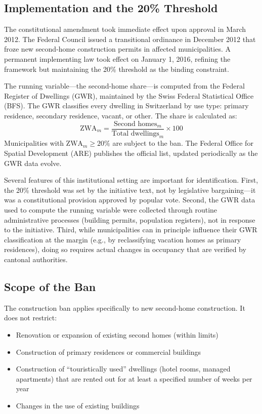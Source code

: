 \documentclass[12pt]{article}
\begin{document}
\subsection{Implementation and the 20\% Threshold}

The constitutional amendment took immediate effect upon approval in March 2012. The Federal Council issued a transitional ordinance in December 2012 that froze new second-home construction permits in affected municipalities. A permanent implementing law took effect on January 1, 2016, refining the framework but maintaining the 20\% threshold as the binding constraint.

The running variable---the second-home share---is computed from the Federal Register of Dwellings (GWR), maintained by the Swiss Federal Statistical Office (BFS). The GWR classifies every dwelling in Switzerland by use type: primary residence, secondary residence, vacant, or other. The share is calculated as:
\begin{equation}\label{eq:zwa}
\text{ZWA}_m = \frac{\text{Second homes}_m}{\text{Total dwellings}_m} \times 100
\end{equation}
Municipalities with $\text{ZWA}_m \geq 20\%$ are subject to the ban. The Federal Office for Spatial Development (ARE) publishes the official list, updated periodically as the GWR data evolve.

Several features of this institutional setting are important for identification. First, the 20\% threshold was set by the initiative text, not by legislative bargaining---it was a constitutional provision approved by popular vote. Second, the GWR data used to compute the running variable were collected through routine administrative processes (building permits, population registers), not in response to the initiative. Third, while municipalities can in principle influence their GWR classification at the margin (e.g., by reclassifying vacation homes as primary residences), doing so requires actual changes in occupancy that are verified by cantonal authorities.

\subsection{Scope of the Ban}

The construction ban applies specifically to new second-home construction. It does not restrict:
\begin{itemize}
\item Renovation or expansion of existing second homes (within limits)
\item Construction of primary residences or commercial buildings
\item Construction of ``touristically used'' dwellings (hotel rooms, managed apartments) that are rented out for at least a specified number of weeks per year
\item Changes in the use of existing buildings
\end{itemize}
\end{document}
